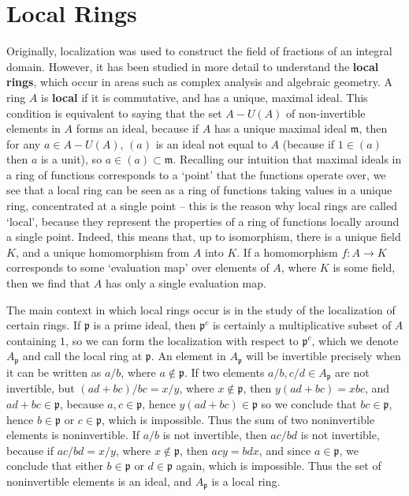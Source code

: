 \section{Local Rings}

Originally, localization was used to construct the field of fractions of an integral domain. However, it has been studied in more detail to understand the {\bf local rings}, which occur in areas such as complex analysis and algebraic geometry. A ring $A$ is {\bf local} if it is commutative, and has a unique, maximal ideal. This condition is equivalent to saying that the set $A - U(A)$ of non-invertible elements in $A$ forms an ideal, because if $A$ has a unique maximal ideal $\mathfrak{m}$, then for any $a \in A - U(A)$, $(a)$ is an ideal not equal to $A$ (because if $1 \in (a)$ then $a$ is a unit), so $a \in (a) \subset \mathfrak{m}$. Recalling our intuition that maximal ideals in a ring of functions corresponds to a `point' that the functions operate over, we see that a local ring can be seen as a ring of functions taking values in a unique ring, concentrated at a single point -- this is the reason why local rings are called `local', because they represent the properties of a ring of functions locally around a single point. Indeed, this means that, up to isomorphism, there is a unique field $K$, and a unique homomorphism from $A$ into $K$. If a homomorphism $f: A \to K$ corresponds to some `evaluation map' over elements of $A$, where $K$ is some field, then we find that $A$ has only a single evaluation map.

The main context in which local rings occur is in the study of the localization of certain rings. If $\mathfrak{p}$ is a prime ideal, then $\mathfrak{p}^c$ is certainly a multiplicative subset of $A$ containing $1$, so we can form the localization with respect to $\mathfrak{p}^c$, which we denote $A_{\mathfrak{p}}$ and call the local ring at $\mathfrak{p}$. An element in $A_{\mathfrak{p}}$ will be invertible precisely when it can be written as $a/b$, where $a \not \in \mathfrak{p}$. If two elements $a/b, c/d \in A_{\mathfrak{p}}$ are not invertible, but $(ad + bc)/bc = x/y$, where $x \not \in \mathfrak{p}$, then $y(ad + bc) = xbc$, and $ad + bc \in \mathfrak{p}$, because $a,c \in \mathfrak{p}$, hence $y(ad + bc) \in \mathfrak{p}$ so we conclude that $bc \in \mathfrak{p}$, hence $b \in \mathfrak{p}$ or $c \in \mathfrak{p}$, which is impossible. Thus the sum of two noninvertible elements is noninvertible. If $a/b$ is not invertible, then $ac/bd$ is not invertible, because if $ac/bd = x/y$, where $x \not \in \mathfrak{p}$, then $acy = bdx$, and since $a \in \mathfrak{p}$, we conclude that either $b \in \mathfrak{p}$ or $d \in \mathfrak{p}$ again, which is impossible. Thus the set of noninvertible elements is an ideal, and $A_{\mathfrak{p}}$ is a local ring.

